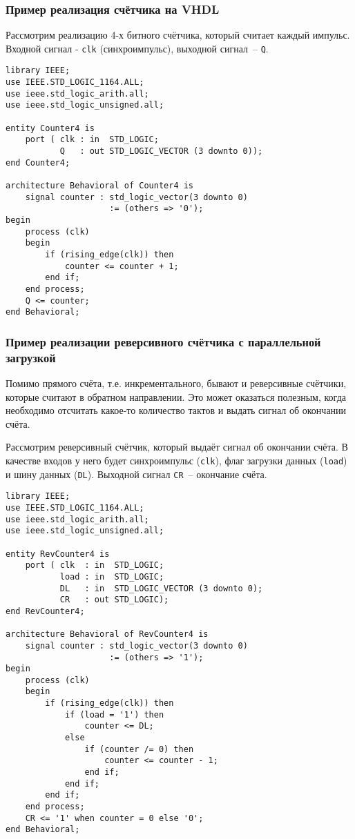 \subsubsection{Пример реализация счётчика на VHDL}

Рассмотрим реализацию 4-х битного счётчика, который считает каждый импульс. Входной сигнал - \lstinline?clk? (синхроимпульс), выходной сигнал~-- \lstinline?Q?.

\begin{Code}
\begin{lstlisting}
library IEEE;
use IEEE.STD_LOGIC_1164.ALL;
use ieee.std_logic_arith.all;
use ieee.std_logic_unsigned.all;

entity Counter4 is
    port ( clk : in  STD_LOGIC;
           Q   : out STD_LOGIC_VECTOR (3 downto 0));
end Counter4;

architecture Behavioral of Counter4 is
    signal counter : std_logic_vector(3 downto 0) 
                     := (others => '0');
begin
    process (clk)
    begin
        if (rising_edge(clk)) then
            counter <= counter + 1;
        end if;
    end process;
    Q <= counter;
end Behavioral;
\end{lstlisting}
\end{Code}

\subsubsection{Пример реализации реверсивного счётчика с параллельной загрузкой}

Помимо прямого счёта, т.е. инкрементального, бывают и реверсивные счётчики, которые считают в обратном направлении. Это может оказаться полезным, когда необходимо отсчитать какое-то количество тактов и выдать сигнал об окончании счёта.

Рассмотрим реверсивный счётчик, который выдаёт сигнал об окончании счёта. В качестве входов у него будет синхроимпульс (\lstinline?clk?), флаг загрузки данных (\lstinline?load?) и шину данных (\lstinline?DL?). Выходной сигнал \lstinline?CR?~-- окончание счёта.

\begin{Code}
\begin{lstlisting}
library IEEE;
use IEEE.STD_LOGIC_1164.ALL;
use ieee.std_logic_arith.all;
use ieee.std_logic_unsigned.all;

entity RevCounter4 is
    port ( clk  : in  STD_LOGIC;
           load : in  STD_LOGIC;
           DL   : in  STD_LOGIC_VECTOR (3 downto 0);
           CR   : out STD_LOGIC);
end RevCounter4;

architecture Behavioral of RevCounter4 is
    signal counter : std_logic_vector(3 downto 0) 
                     := (others => '1');
begin
    process (clk)
    begin
        if (rising_edge(clk)) then
            if (load = '1') then
                counter <= DL;
            else
                if (counter /= 0) then
                    counter <= counter - 1;
                end if;
            end if;
        end if;
    end process;
    CR <= '1' when counter = 0 else '0';
end Behavioral;
\end{lstlisting}
\end{Code}


